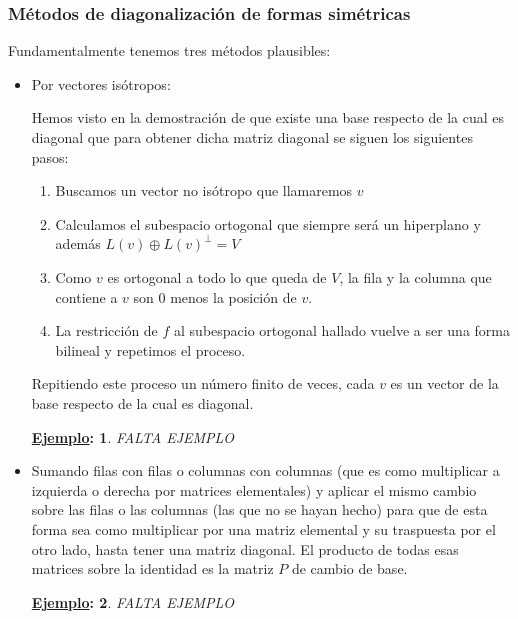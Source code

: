 \documentclass[10pt,a4paper,openright]{book}
\theoremstyle{break}
\newtheorem*{ej}{\underline{Ejemplo}:}
\begin{document}
\subsubsection{Métodos de diagonalización de formas simétricas}
Fundamentalmente tenemos tres métodos plausibles:
\begin{itemize}
\item Por vectores isótropos:

Hemos visto en la demostración de que existe una base respecto de la cual es diagonal que para obtener dicha matriz diagonal se siguen los siguientes pasos:
	\begin{enumerate}
	\item Buscamos un vector no isótropo que llamaremos $v$
	\item Calculamos el subespacio ortogonal que siempre será un hiperplano y además $L(v)\oplus L(v)^\perp = V$
	\item Como $v$ es ortogonal a todo lo que queda de $V$, la fila y la columna que contiene a $v$ son 0 menos la posición de $v$.
	\item La restricción de $f$ al subespacio ortogonal hallado vuelve a ser una forma bilineal y repetimos el proceso.
	\end{enumerate}
	Repitiendo este proceso un número finito de veces, cada $v$ es un vector de la base respecto de la cual es diagonal.
	\begin{ej}
	FALTA EJEMPLO
	\end{ej}
	
\item Sumando filas con filas o columnas con columnas (que es como multiplicar a izquierda o derecha por matrices elementales) y aplicar el mismo cambio sobre las filas o las columnas (las que no se hayan hecho) para que de esta forma sea como multiplicar por una matriz elemental y su traspuesta por el otro lado, hasta tener una matriz diagonal. El producto de todas esas matrices sobre la identidad es la matriz $P$ de cambio de base.
	\begin{ej}
	FALTA EJEMPLO
	\end{ej}
	

\end{itemize}
\end{document}
